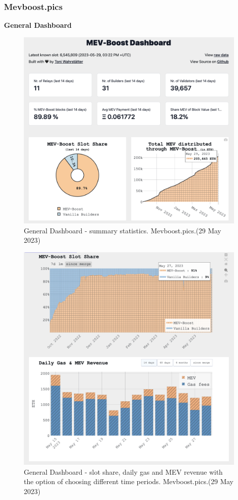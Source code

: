 \documentclass[UTF8]{article}
\begin{document}
{\clearpage
\subsubsection*{Mevboost.pics}
\textbf{General Dashboard} \\
\begin{figure}[htbp]
\begin{center}
\includegraphics[width=0.9\linewidth]{images/mevhome1}
\caption{General Dashboard - summary statistics. Mevboost.pics.(29 May 2023)}
\label{fig:mevhome1}
\end{center}
\end{figure}

\begin{figure}[htbp]
\begin{center}
\includegraphics[width=0.9\linewidth]{images/mevhome2}
\caption{General Dashboard - slot share, daily gas and MEV revenue with the option of choosing different time periods. Mevboost.pics.(29 May 2023)}
\label{fig:mevhome2}
\end{center}
\end{figure}

}
\end{document}
